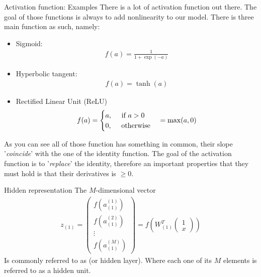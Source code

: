 \begin{parag}{Activation function: Examples}
    There is a lot of activation function out there. The goal of those functions is always to add nonlinearity to our model. There is three main function as such, namely:
	\begin{itemize}
	\item Sigmoid: \begin{align*} f\left(a\right) = \frac{1}{1 + \exp\left(-a\right)} \end{align*}
	\item Hyperbolic tangent:
		\begin{align*} f\left(a\right) =  \tanh\left(a\right) \end{align*}
		\item Rectified Linear Unit (ReLU)
			\begin{align*} 
				f\left(a\right) = \begin{cases}
				a, \mathspace \text{ if } a > 0\\ 0, \mathspace \text{ otherwise}
				\end{cases} =  \max\left(a, 0\right)
			\end{align*}
	\end{itemize}
	As you can see all of those function has something in common, their slope '\textit{coincide}' with the one of the identity function. The goal of the activation function is to '\textit{replace}' the identity, therefore an important properties that they must hold is that their derivatives is $\geq 0$.
\end{parag}


\begin{parag}{Hidden representation}
    The $M$-dimensional vector 
	\begin{align*} 
		z_{\left(1\right)} = \begin{pmatrix} f\left(a_{\left(1\right)}^{\left(1\right)}\right) \\ f\left(a_{\left(1\right)}^{\left(2\right)}\right) \\ \vdots \\ f\left(a_{\left(1\right)}^{\left(M\right)}\right) \end{pmatrix}  = f\left(W_{\left(1\right)}^{T}\begin{pmatrix} 1 \\ x \end{pmatrix} \right)
	\end{align*}
	Is commonly referred to as  (or hidden layer). Where each one of its $M$ elements is referred to as a hidden unit.
\end{parag}


